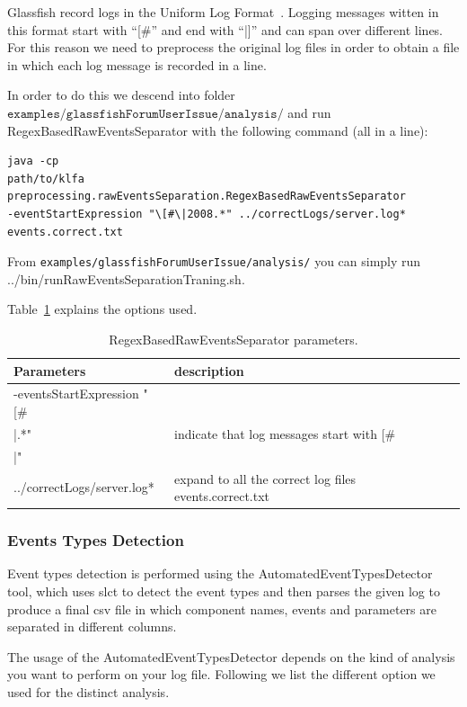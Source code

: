 Glassfish record logs in the Uniform Log Format~\cite{ulf}. Logging
messages witten in this format start with ``[\#'' and end with ``|]''
and can span over different lines. For this reason we need to
preprocess the original log files in order to obtain a file in which
each log message is recorded in a line.

In order to do this we descend into folder \linebreak
$\texttt{examples/glassfishForumUserIssue/analysis/}$
and run RegexBasedRawEventsSeparator with the following
command (all in a line):


\begin{verbatim}
java -cp
path/to/klfa
preprocessing.rawEventsSeparation.RegexBasedRawEventsSeparator 
-eventStartExpression "\[#\|2008.*" ../correctLogs/server.log*
events.correct.txt
\end{verbatim}

From \texttt{examples/glassfishForumUserIssue/analysis/} you can simply run
../bin/runRawEventsSeparationTraning.sh.

Table~\ref{res} explains the options used.


\begin{table}
\begin{tabular}{|p{6cm}|p{4cm}|}
\hline
 Parameters&description\\
\hline
-eventsStartExpression 
 "[\#\\|.*" 
& indicate that log messages
 start with [\#\\|"
\\
\hline
 ../correctLogs/server.log*& expand to all the correct log files
 events.correct.txt\\
\hline
\end{tabular}
\label{res}
\caption{RegexBasedRawEventsSeparator parameters.}
\end{table}


\subsubsection*{Events Types Detection}

Event types detection is performed using the
AutomatedEventTypesDetector tool, which uses slct to detect the
event types and then parses the given log to produce a final csv file
in which component names, events and parameters are separated in
different columns.

The usage of the AutomatedEventTypesDetector depends on the kind of
analysis you want to perform on your log file. Following we list the
different option we used for the distinct analysis.




